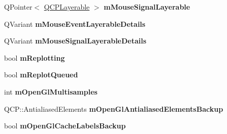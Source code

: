 \begin{DoxyCompactItemize}
\item 
Q\+Pointer$<$ \hyperlink{classQCPLayerable}{Q\+C\+P\+Layerable} $>$ {\bfseries m\+Mouse\+Signal\+Layerable}\hypertarget{classQCustomPlot_adf81640dbf365bd4fa22494e3e504e70}{}\label{classQCustomPlot_adf81640dbf365bd4fa22494e3e504e70}

\item 
Q\+Variant {\bfseries m\+Mouse\+Event\+Layerable\+Details}\hypertarget{classQCustomPlot_ad604958ef16fc022c474521a08d88a2d}{}\label{classQCustomPlot_ad604958ef16fc022c474521a08d88a2d}

\item 
Q\+Variant {\bfseries m\+Mouse\+Signal\+Layerable\+Details}\hypertarget{classQCustomPlot_a2f313604bb22781633137915f3c100e6}{}\label{classQCustomPlot_a2f313604bb22781633137915f3c100e6}

\item 
bool {\bfseries m\+Replotting}\hypertarget{classQCustomPlot_ab30daeca6612c3948afd368dce5f1c39}{}\label{classQCustomPlot_ab30daeca6612c3948afd368dce5f1c39}

\item 
bool {\bfseries m\+Replot\+Queued}\hypertarget{classQCustomPlot_acedeef316dfcde835b8ea0112cec2a77}{}\label{classQCustomPlot_acedeef316dfcde835b8ea0112cec2a77}

\item 
int {\bfseries m\+Open\+Gl\+Multisamples}\hypertarget{classQCustomPlot_aacafac2b2280b6a868a4b734273a394c}{}\label{classQCustomPlot_aacafac2b2280b6a868a4b734273a394c}

\item 
Q\+C\+P\+::\+Antialiased\+Elements {\bfseries m\+Open\+Gl\+Antialiased\+Elements\+Backup}\hypertarget{classQCustomPlot_adbf005715d5f8550511819a4baf841fb}{}\label{classQCustomPlot_adbf005715d5f8550511819a4baf841fb}

\item 
bool {\bfseries m\+Open\+Gl\+Cache\+Labels\+Backup}\hypertarget{classQCustomPlot_ab1692469dde841080fa33719533bf2b7}{}\label{classQCustomPlot_ab1692469dde841080fa33719533bf2b7}

\end{DoxyCompactItemize}
